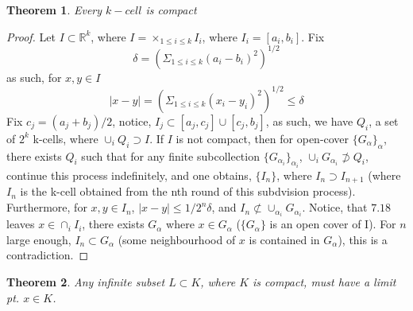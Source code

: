 \documentclass{amsart}
\numberwithin{equation}{section}
\theoremstyle{plain}
\newtheorem{thm}{Theorem}[section]
\theoremstyle{definition}
\begin{document}
\begin{thm}
  Every $k-cell$ is compact
\end{thm}
\begin{proof}
    Let $I \subset \mathbb{R}^k$, where $I = \times_{1 \leq i \leq k} I_i$, where $I_i = [a_{i}, b_i]$. Fix
    \begin{equation} \delta = (\Sigma_{1 \leq i \leq k} (a_i - b_i)^2)^{1/2}\end{equation} as such, for $x,y \in I$
    \begin{equation}
      |x - y| = (\Sigma_{1 \leq i \leq k} (x_i - y_i)^2)^{1/2} \leq \delta
    \end{equation}
    Fix $c_j = (a_j + b_j)/2$, notice, $I_j \subset [a_j, c_j] \cup [c_j, b_j]$, as such, we have ${Q_i}$, a set of $2^k$ k-cells, where
    $\cup_{i} Q_i \supset I$. If $I$ is not compact, then for open-cover $\{G_{\alpha}\}_{\alpha}$, there exists $Q_i$ such that
    for any finite subcollection $\{G_{\alpha_i}\}_{\alpha_i}$, $\cup_i G_{\alpha_i} \not \supset Q_i$, continue this process indefinitely,
    and one obtains, $\{I_n\}$, where $I_n \supset I_{n+1}$ (where $I_n$ is the k-cell obtained from the nth round of this subdvision process). Furthermore,
    for $x, y \in I_n$, $|x - y| \leq 1/2^n\delta$, and $I_n \not \subset \cup_{\alpha_i} G_{\alpha_i}$. Notice, that $7.18$ leaves $x \in \cap_i I_i$, there exists
    $G_{\alpha}$ where $x \in G_{\alpha}$ ($\{G_{\alpha}\}$ is an open cover of I). For $n$ large enough, $I_n \subset G_{\alpha}$ (some neighbourhood of $x$ is contained in $G_{\alpha}$), 
    this is a contradiction. 
\end{proof}

\begin{thm}
  Any infinite subset $L \subset K$, where $K$ is compact, must have a limit pt. $x \in K$.
\end{thm}
\end{document}
